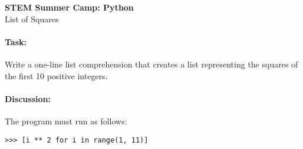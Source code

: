 \documentclass[11pt]{article}
\begin{document}
    \begin{center}

        \large\textbf{STEM Summer Camp: Python} \\
        List of Squares \\

    \end{center}

    \paragraph{Task:} Write a one-line list comprehension that creates a
    list representing the squares of the first 10 positive integers.  
    
    \paragraph{Discussion:} The program must run as follows:
    
    \vspace{1.5em}

\begin{verbatim}
>>> [i ** 2 for i in range(1, 11)]
\end{verbatim}
    
\end{document}
